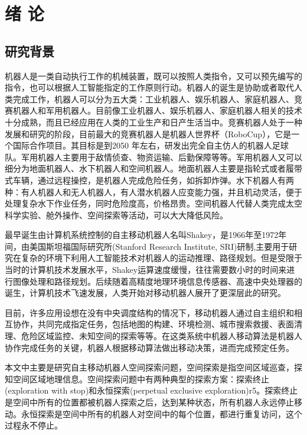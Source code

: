 \chapter{绪\hskip 0.4cm 论}

\section{研究背景}
机器人是一类自动执行工作的机械装置，既可以按照人类指令，又可以预先编写的指令，也可以根据人工智能指定的工作原则行动。机器人的诞生是协助或者取代人类完成工作，机器人可以分为五大类：工业机器人、娱乐机器人、家庭机器人、竞赛机器人和军用机器人。目前像工业机器人、娱乐机器人、家庭机器人相关的技术十分成熟，而且已经应用在人类的工业生产和日产生活当中。竞赛机器人处于一种发展和研究的阶段，目前最大的竞赛机器人是机器人世界杯（RoboCup），它是一个国际合作项目。其目标是到2050 年左右，研发出完全自主仿人的机器人足球队。军用机器人主要用于敌情侦查、物资运输、后勤保障等等。军用机器人又可以细分为地面机器人、水下机器人和空间机器人。地面机器人主要是指轮式或者履带式车辆，通过远程操控，是机器人完成危险任务，如拆卸炸弹。水下机器人有两种：有人机器人和无人机器人，有人潜水机器人应变能力强，并且机动灵活，便于处理复杂水下作业任务，同时危险度高，价格昂贵。空间机器人代替人类完成太空科学实验、舱外操作、空间探索等活动，可以大大降低风险。

最早诞生由计算机系统控制的自主移动机器人名叫Shakey，是1966年至1972年间，由美国斯坦福国际研究所(Stanford Research Institute, SRI)研制\cite{rr1},主要用于研究在复杂的环境下利用人工智能技术对机器人的运动推理、路径规划\cite{rr2}。但是受限于当时的计算机技术发展水平，Shakey运算速度缓慢，往往需要数小时的时间来进行图像处理和路径规划。后续随着高精度地理环境信息传感器、高速中央处理器的诞生，计算机技术飞速发展，人类开始对移动机器人展开了更深层此的研究。

目前，许多应用设想在没有中央调度结构的情况下，移动机器人通过自主组织和相互协作，共同完成指定任务，包括地图的构建、环境检测、城市搜索救援、表面清理、危险区域监控、未知空间的探索等等\cite{r5}。在这类系统中机器人移动算法是机器人协作完成任务的关键，机器人根据移动算法做出移动决策，进而完成预定任务。

本文中主要是研究自主移动机器人空间探索问题\cite{r1}\cite{r2}，空间探索是指空间区域巡查，探知空间区域地理信息。空间探索问题中有两种典型的探索方案：探索终止(exploration with stop)\cite{r7}和永恒探索(perpetual exclusive exploration){r5}。探索终止是空间中所有的位置都被机器人探索之后，达到某种状态，所有机器人永远停止移动。永恒探索是空间中所有的机器人对空间中的每个位置，都进行重复访问，这个过程永不停止。

